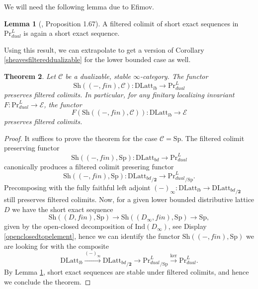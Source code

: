 \documentclass[10pt]{amsart}
\newtheorem{theorem}{Theorem}[section]
\theoremstyle{definition}
\newtheorem{lemma}[theorem]{Lemma}
\begin{document}
We will need the following lemma due to Efimov.

\begin{lemma}[\cite{efimov2025ktheorylocalizinginvariantslarge}, Proposition 1.67] \label{efimovslemma}
A filtered colimit of short exact sequences in $\mathrm{Pr}^L_{dual}$ is again a short exact sequence.
\end{lemma}

Using this result, we can extrapolate to get a version of Corollary \ref{sheavesfiltereddualizable} for the lower bounded case as well.

\begin{theorem} \label{sheavesfiltereddualizablelowerbounded}
Let $\mathcal{C}$ be a dualizable, stable $\infty$-category. The functor
$$ \mathrm{Sh}((-,fin),\mathcal{C}) : \mathrm{DLatt}_{lb} \rightarrow \mathrm{Pr}^L_{dual} $$
preserves filtered colimits. In particular, for any finitary localizing invariant $F : \mathrm{Pr}^L_{dual} \rightarrow \mathcal{E}$, the functor
$$F( \mathrm{Sh}((-,fin),\mathcal{C})) : \mathrm{DLatt}_{lb} \rightarrow \mathcal{E}$$ preserves filtered colimits.
\end{theorem}

\begin{proof}
It suffices to prove the theorem for the case $\mathcal{C} = \mathrm{Sp}$. The filtered colimit preserving functor
$$ \mathrm{Sh}((-,fin),\mathrm{Sp}) : \mathrm{DLatt}_{bd} \rightarrow  \mathrm{Pr}^L_{dual} $$
canonically produces a filtered colimit presering functor
$$ \mathrm{Sh}((-,fin),\mathrm{Sp}) : {\mathrm{DLatt}_{bd}}_{/\mathbf{2}} \rightarrow  {\mathrm{Pr}^L_{dual}}_{/ \mathrm{Sp}}. $$
Precomposing with the fully faithful left adjoint $(-)_\infty : \mathrm{DLatt}_{lb} \rightarrow {\mathrm{DLatt}_{bd}}_{/\mathbf{2}}$ still preserves filtered colimits. Now, for a given lower bounded distributive lattice $D$ we have the short exact sequence
$$ \mathrm{Sh}((D, fin), \mathrm{Sp} ) \rightarrow \mathrm{Sh}((D_\infty, fin), \mathrm{Sp} ) \rightarrow \mathrm{Sp},$$
given by the open-closed decomposition of $\mathrm{Ind}(D_\infty)$, see Display \ref{openclosedtopelement}, hence we can identify the functor $\mathrm{Sh}((-, fin), \mathrm{Sp} )$ we are looking for with the composite
$$\mathrm{DLatt}_{lb} \xrightarrow{(-)_\infty} {\mathrm{DLatt}_{bd}}_{/\mathbf{2}} \rightarrow  {\mathrm{Pr}^L_{dual}}_{/ \mathrm{Sp}} \xrightarrow{\mathrm{ker}}  \mathrm{Pr}^L_{dual}. $$
By Lemma \ref{efimovslemma}, short exact sequences are stable under filtered colimits, and hence we conclude the theorem.
\end{proof}
\end{document}
